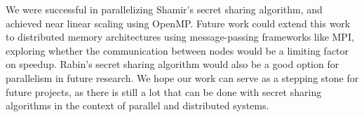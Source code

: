 \documentclass[main.tex]{subfiles}
\begin{document}
\indent We were successful in parallelizing Shamir's secret sharing algorithm, and achieved near linear scaling using OpenMP. Future work could extend this work to distributed memory architectures using message-passing frameworks like MPI, exploring whether the communication between nodes would be a limiting factor on speedup. Rabin's secret sharing algorithm \cite{five} would also be a good option for parallelism in future research. We hope our work can serve as a stepping stone for future projects, as there is still a lot that can be done with secret sharing algorithms in the context of parallel and distributed systems.



\end{document}
